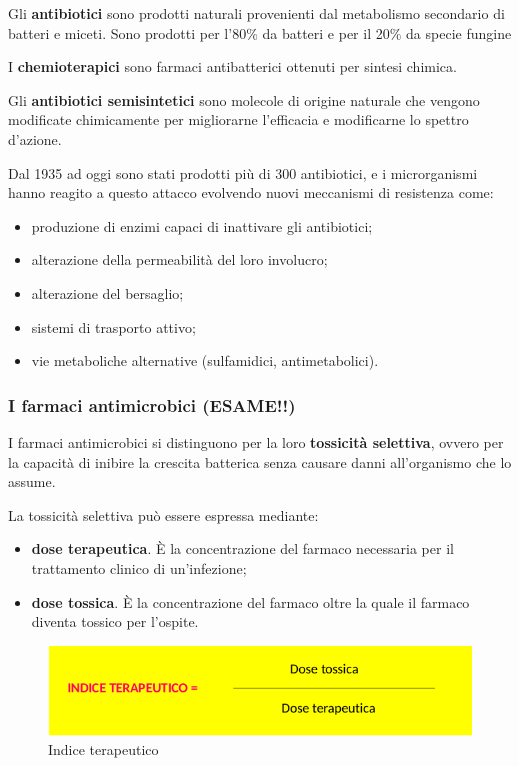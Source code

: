 \documentclass[11pt]{book}
\begin{document}
\vspace{1em}
Gli \textbf{antibiotici} sono prodotti naturali provenienti dal metabolismo secondario di batteri e miceti. Sono prodotti per l’80$\%$ da batteri e per il 20$\%$ da specie fungine 

I \textbf{chemioterapici} sono farmaci antibatterici ottenuti per sintesi chimica.

Gli \textbf{antibiotici semisintetici} sono molecole di origine naturale che vengono modificate chimicamente per migliorarne l’efficacia e modificarne lo spettro d’azione.

\vspace{1em}
Dal 1935 ad oggi sono stati prodotti più di 300 antibiotici, e i microrganismi hanno reagito a questo attacco evolvendo nuovi meccanismi di resistenza come:
\begin{itemize}
\item produzione di enzimi capaci di inattivare gli antibiotici;
\item alterazione della permeabilità del loro involucro;
\item alterazione del bersaglio;
\item sistemi di trasporto attivo;
\item vie metaboliche alternative (sulfamidici, antimetabolici).
\end{itemize}
                                                  


\subsubsection{I farmaci antimicrobici (ESAME!!)}
I farmaci antimicrobici si distinguono per la loro \textbf{tossicità selettiva}, ovvero per la capacità di inibire la crescita batterica senza causare danni all’organismo che lo assume. 

La tossicità selettiva può essere espressa mediante: 
\begin{itemize}
\item \textbf{dose terapeutica}. \`E la concentrazione del farmaco necessaria per il trattamento clinico di un’infezione;
\item \textbf{dose tossica}. \`E la concentrazione del farmaco oltre la quale il farmaco diventa tossico per l’ospite.
\end{itemize}

\begin{figure}[htp]
\centering
\includegraphics[scale=0.45]{img/Indice terapeutico.png}
\caption{Indice terapeutico}
\label{}
\end{figure}
\end{document}
